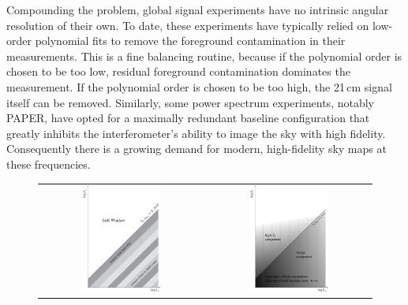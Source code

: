 \begin{bibunit}
Compounding the problem, global signal experiments have no intrinsic angular resolution of their
own. To date, these experiments have typically relied on low-order polynomial fits to remove the
foreground contamination in their measurements. This is a fine balancing routine, because if the
polynomial order is chosen to be too low, residual foreground contamination dominates the
measurement. If the polynomial order is chosen to be too high, the 21\,cm signal itself can be
removed. Similarly, some power spectrum experiments, notably PAPER, have opted for a maximally
redundant baseline configuration that greatly inhibits the interferometer's ability to image the sky
with high fidelity. Consequently there is a growing demand for modern, high-fidelity sky maps at
these frequencies.

\begin{figure}
    \centering
    \begin{tabular}{cc}
        \includegraphics[width=0.49\textwidth]{figures/chapter1/morales-foreground-wedge-illustration} &
        \includegraphics[width=0.49\textwidth]{figures/chapter1/morales-foreground-wedge-calibration-errors} \\

\end{tabular}
\end{figure}
\end{bibunit}
